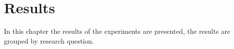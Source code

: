 \chapter{Results}
\label{results}


In this chapter the results of the experiments are presented, the results are grouped by research question.

